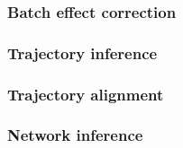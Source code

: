 \subsubsection{Batch effect correction}
\subsubsection{Trajectory inference}
\subsubsection{Trajectory alignment}
\subsubsection{Network inference}








